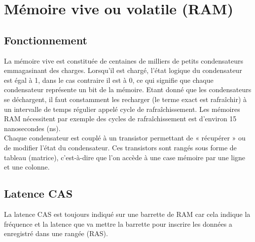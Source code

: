 \documentclass[a4paper,12pt]{article}
\begin{document}
    
    \newpage
    
    \section{Mémoire vive ou volatile (RAM)\protect\footnotemark[1]}
    
        \subsection{Fonctionnement}
            La mémoire vive est constituée de centaines de milliers de petits condensateurs emmagasinant des charges. Lorsqu'il est chargé, l'état logique du condensateur est égal à 1, dans le cas contraire il est à 0, ce qui signifie que chaque condensateur représente un bit de la mémoire.
            Etant donné que les condensateurs se déchargent, il faut constamment les recharger (le terme exact est rafraîchir) à un intervalle de temps régulier appelé cycle de rafraîchissement. Les mémoires RAM nécessitent par exemple des cycles de rafraîchissement est d'environ 15 nanosecondes (ns).\\
            Chaque condensateur est couplé à un transistor permettant de « récupérer » ou de modifier l'état du condensateur. Ces transistors sont rangés sous forme de tableau (matrice), c'est-à-dire que l'on accède à une case mémoire  par une ligne et une colonne.
            
        \subsection{Latence CAS\protect\footnotemark[2]}
            La latence CAS est toujours indiqué sur une barrette de RAM car cela indique la fréquence et la latence que va mettre la barrette pour inscrire les données a enregistré dans une rangée (RAS\footnotemark[3]).
\end{document}
